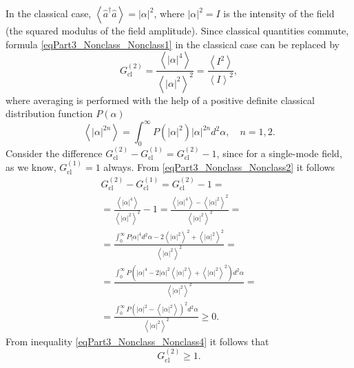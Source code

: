 In the classical case, $\left<\hat{a}^{\dag}\hat{a}\right> =
\left|\alpha\right|^2$, where $\left|\alpha\right|^2 = I$ is the intensity
of the field (the squared modulus of the field amplitude). Since classical quantities
commute, formula \eqref{eqPart3_Nonclass_Nonclass1} in the classical
case can be replaced by
\begin{equation}
G^{(2)}_{\mbox{cl}} = 
\frac{\left<\left|\alpha\right|^4\right>}{\left<\left|\alpha\right|^2\right>^2}
= 
\frac{\left<I^2\right>}{\left<I\right>^2},
\label{eqPart3_Nonclass_Nonclass2}
\end{equation}
where averaging is performed with the help of a positive
definite classical distribution function $P\left(\alpha\right)$
\begin{equation}
\left<\left|\alpha\right|^{2n}\right> = 
\int_0^{\infty}P\left(\left|\alpha\right|^2\right)
\left|\alpha\right|^{2n}d^2\alpha, \quad n=1,2.
\nonumber
\end{equation}
Consider the difference 
$G^{(2)}_{\mbox{cl}} - G^{(1)}_{\mbox{cl}} = G^{(2)}_{\mbox{cl}} -
1$, since for a single-mode field, as we know, $G^{(1)}_{\mbox{cl}} =
1$ always. From \eqref{eqPart3_Nonclass_Nonclass2} it follows
\begin{eqnarray}
G^{(2)}_{\mbox{cl}} - G^{(1)}_{\mbox{cl}} = G^{(2)}_{\mbox{cl}} -
1 = 
\nonumber \\
=
\frac{\left<\left|\alpha\right|^4\right>}{\left<\left|\alpha\right|^2\right>^2}
- 1 = 
\frac{\left<\left|\alpha\right|^4\right> -
  \left<\left|\alpha\right|^2\right>^2}{\left<\left|\alpha\right|^2\right>^2}
= 
\nonumber \\
= \frac{\int_0^{\infty} P \left|\alpha\right|^4 d^2\alpha - 2
  \left<\left|\alpha\right|^2\right>^2 +
  \left<\left|\alpha\right|^2\right>^2}{\left<\left|\alpha\right|^2\right>^2}
= 
\nonumber \\
= 
\frac{\int_0^{\infty} P \left(\left|\alpha\right|^4  - 2
  \left|\alpha\right|^2
  \left<\left|\alpha\right|^2\right> +
  \left<\left|\alpha\right|^2\right>^2\right)d^2\alpha}
     {\left<\left|\alpha\right|^2\right>^2}
=
\nonumber \\
=
\frac{\int_0^{\infty} P \left(\left|\alpha\right|^2  - 
  \left<\left|\alpha\right|^2\right>\right)^2 d^2\alpha}{\left<\left|\alpha\right|^2\right>^2}
\ge 0.
\label{eqPart3_Nonclass_Nonclass4}
\end{eqnarray}
From inequality \eqref{eqPart3_Nonclass_Nonclass4} it follows that
\begin{equation}
G^{(2)}_{\mbox{cl}} \ge 1.
\nonumber
\end{equation}
